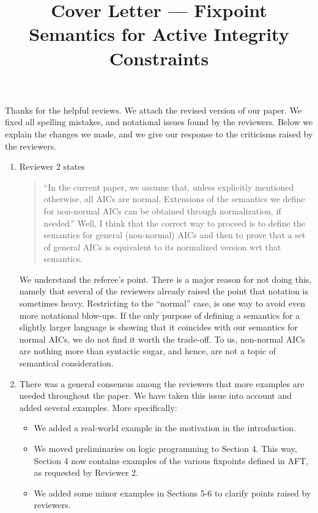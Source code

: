\documentclass{article}
\title{Cover Letter --- Fixpoint Semantics for Active Integrity Constraints}
\begin{document}
\maketitle
Thanks for the helpful reviews. We attach the revised version of our paper. 
 We fixed all spelling mistakes, and notational issues found by the reviewers.
Below we explain the changes we made, and we give our response to the criticisms raised by the reviewers. 


	\begin{enumerate}
	 \item Reviewer 2 states
	 \begin{quote}
	  ``In the current paper, we assume that, unless explicitly mentioned otherwise, all AICs are normal.
Extensions of the semantics we deﬁne for non-normal AICs can be obtained through normalization, if needed.''
Well, I think that the correct way to proceed is to define the semantics for general (non-normal) AICs and
then to prove that a set of general AICs is equivalent to its normalized version wrt that semantics.
	 \end{quote}
         We understand the referee's point. There is a major reason for not doing this, namely that several of the reviewers already raised the point that notation is sometimes heavy. Restricting to the ``normal'' case, is one way to avoid even more notational blow-ups. If the only purpose of defining a semantics for a slightly larger language is showing that it coincides with our semantics for normal AICs, we do not find it worth the trade-off. To us, non-normal AICs are nothing more than syntactic sugar, and hence, are not a topic of semantical consideration. 


	 \item There was a general consensus among the reviewers that more examples are needed throughout the paper. We have taken this issue into account and added several examples. More specifically:
	  \begin{itemize}
	  \item We added a real-world example in the motivation in the introduction.
	  \item We moved preliminaries on logic programming to Section 4. This way, Section 4 now contains examples of the various fixpoints defined in AFT, as requested by Reviewer 2. 
	  \item We added some minor examples in Sections 5-6 to clarify points raised by reviewers. 
	  \end{itemize}
	  

\end{enumerate}
\end{document}
